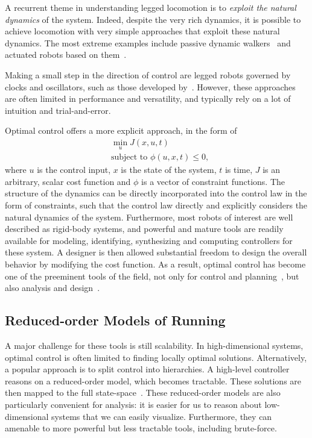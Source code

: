 A recurrent theme in understanding legged locomotion is to \emph{exploit the natural dynamics} of the system. Indeed, despite the very rich dynamics, it is possible to achieve locomotion with very simple approaches that exploit these natural dynamics.
The most extreme examples include passive dynamic walkers~\cite{mcgeer1990passive} and actuated robots based on them~\cite{bhounsule2012design,wisse2006design,tedrake2005learning}. \par
Making a small step in the direction of control are legged robots governed by clocks and oscillators, such as those developed by~\textcite{sprowitz2013towards,buchli2006resonance,altendorfer2001rhex,owaki2013simple}. However, these approaches are often limited in performance and versatility, and typically rely on a lot of intuition and trial-and-error. \par
Optimal control offers a more explicit approach, in the form of 
\begin{align}
& \min_{u} J(x, u, t) \\
& \text{subject to } \phi(u, x, t) \leq 0,
\end{align}
where $u$ is the control input, $x$ is the state of the system, $t$ is time, $J$ is an arbitrary, scalar cost function and $\phi$ is a vector of constraint functions. The structure of the dynamics can be directly incorporated into the control law in the form of constraints, such that the control law directly and explicitly considers the natural dynamics of the system. Furthermore, most robots of interest are well described as rigid-body systems, and powerful and mature tools are readily available for modeling, identifying, synthesizing and computing controllers for these system. A designer is then allowed substantial freedom to design the overall behavior by modifying the cost function. As a result, optimal control has become one of the preeminent tools of the field, not only for control and planning~\cite{koolen2016design,ponton2016convex,winkler2018gait,mombaur_2009,deits2014footstep}, but also analysis and design~\cite{ha2018codesign,takahashi2019spring,mombaur_2009,Yesilevskiy_2018,Birn-Jeffery3786}.

\subsection{Reduced-order Models of Running}

A major challenge for these tools is still scalability. In high-dimensional systems, optimal control is often limited to finding locally optimal solutions. Alternatively, a popular approach is to split control into hierarchies. A high-level controller reasons on a reduced-order model, which becomes tractable. These solutions are then mapped to the full state-space~\cite{herzog2016momentum,dai2014whole,wensing2013high}. These reduced-order models are also particularly convenient for analysis: it is easier for us to reason about low-dimensional systems that we can easily visualize. Furthermore, they can amenable to more powerful but less tractable tools, including brute-force. \par

